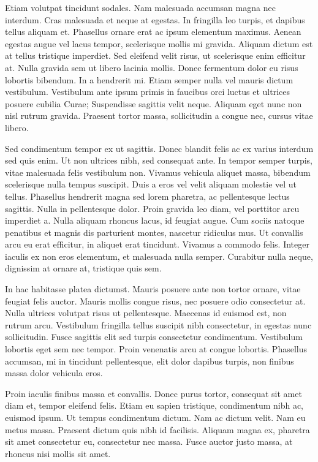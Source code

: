 Etiam volutpat tincidunt sodales. Nam malesuada accumsan magna nec interdum. Cras malesuada et neque at egestas. In fringilla leo turpis, et dapibus tellus aliquam et. Phasellus ornare erat ac ipsum elementum maximus. Aenean egestas augue vel lacus tempor, scelerisque mollis mi gravida. Aliquam dictum est at tellus tristique imperdiet. Sed eleifend velit risus, ut scelerisque enim efficitur at. Nulla gravida sem ut libero lacinia mollis. Donec fermentum dolor eu risus lobortis bibendum. In a hendrerit mi. Etiam semper nulla vel mauris dictum vestibulum. Vestibulum ante ipsum primis in faucibus orci luctus et ultrices posuere cubilia Curae; Suspendisse sagittis velit neque. Aliquam eget nunc non nisl rutrum gravida. Praesent tortor massa, sollicitudin a congue nec, cursus vitae libero.

Sed condimentum tempor ex ut sagittis. Donec blandit felis ac ex varius interdum sed quis enim. Ut non ultrices nibh, sed consequat ante. In tempor semper turpis, vitae malesuada felis vestibulum non. Vivamus vehicula aliquet massa, bibendum scelerisque nulla tempus suscipit. Duis a eros vel velit aliquam molestie vel ut tellus. Phasellus hendrerit magna sed lorem pharetra, ac pellentesque lectus sagittis. Nulla in pellentesque dolor. Proin gravida leo diam, vel porttitor arcu imperdiet a. Nulla aliquam rhoncus lacus, id feugiat augue. Cum sociis natoque penatibus et magnis dis parturient montes, nascetur ridiculus mus. Ut convallis arcu eu erat efficitur, in aliquet erat tincidunt. Vivamus a commodo felis. Integer iaculis ex non eros elementum, et malesuada nulla semper. Curabitur nulla neque, dignissim at ornare at, tristique quis sem.

In hac habitasse platea dictumst. Mauris posuere ante non tortor ornare, vitae feugiat felis auctor. Mauris mollis congue risus, nec posuere odio consectetur at. Nulla ultrices volutpat risus ut pellentesque. Maecenas id euismod est, non rutrum arcu. Vestibulum fringilla tellus suscipit nibh consectetur, in egestas nunc sollicitudin. Fusce sagittis elit sed turpis consectetur condimentum. Vestibulum lobortis eget sem nec tempor. Proin venenatis arcu at congue lobortis. Phasellus accumsan, mi in tincidunt pellentesque, elit dolor dapibus turpis, non finibus massa dolor vehicula eros.

Proin iaculis finibus massa et convallis. Donec purus tortor, consequat sit amet diam et, tempor eleifend felis. Etiam eu sapien tristique, condimentum nibh ac, euismod ipsum. Ut tempus condimentum dictum. Nam ac dictum velit. Nam eu metus massa. Praesent dictum quis nibh id facilisis. Aliquam magna ex, pharetra sit amet consectetur eu, consectetur nec massa. Fusce auctor justo massa, at rhoncus nisi mollis sit amet.


